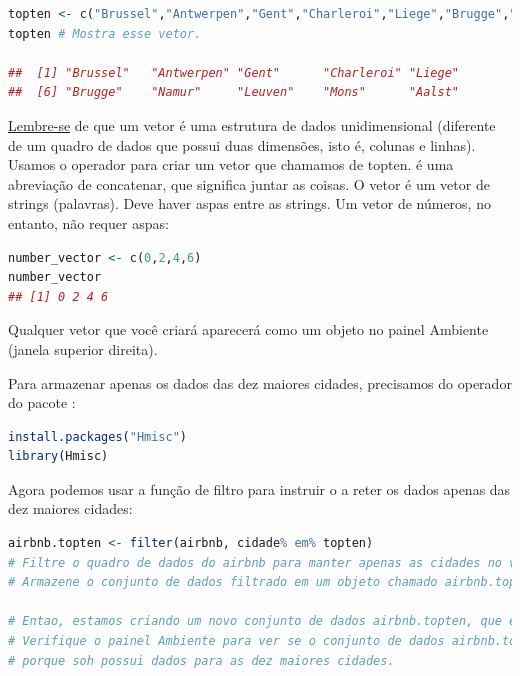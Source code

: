 \documentclass{article}
\begin{document}
\begin{lstlisting}[language=R]
topten <- c("Brussel","Antwerpen","Gent","Charleroi","Liege","Brugge","Namur","Leuven","Mons","Aalst") # Cria um vetor com as 10 maiores cidades
topten # Mostra esse vetor.

##  [1] "Brussel"   "Antwerpen" "Gent"      "Charleroi" "Liege"    
##  [6] "Brugge"    "Namur"     "Leuven"    "Mons"      "Aalst"
\end{lstlisting}

\href{https://bookdown.org/content/1340/airbnbdata.html#assignment}{Lembre-se} de que um vetor é uma estrutura de dados unidimensional (diferente de um quadro de dados que possui duas dimensões, isto é, colunas e linhas). Usamos o operador  para criar um vetor que chamamos de topten.  é uma abreviação de concatenar, que significa juntar as coisas. O vetor  é um vetor de strings (palavras). Deve haver aspas entre as strings. Um vetor de números, no entanto, não requer aspas:

\begin{lstlisting}[language=R]
number_vector <- c(0,2,4,6)
number_vector
## [1] 0 2 4 6
\end{lstlisting}

Qualquer vetor que você criará aparecerá como um objeto no painel Ambiente (janela superior direita).

\vspace{.25cm}
\vspace{.25cm}

Para armazenar apenas os dados das dez maiores cidades, precisamos do operador  do pacote :

\begin{lstlisting}[language=R]
install.packages("Hmisc")
library(Hmisc)
\end{lstlisting}

Agora podemos usar a função de filtro para instruir o \faRProject a reter os dados apenas das dez maiores cidades:

\begin{lstlisting}[language=R]
airbnb.topten <- filter(airbnb, cidade% em% topten)
# Filtre o quadro de dados do airbnb para manter apenas as cidades no vetor topten.
# Armazene o conjunto de dados filtrado em um objeto chamado airbnb.topten.

# Entao, estamos criando um novo conjunto de dados airbnb.topten, que eh um subconjunto do conjunto de dados airbnb.
# Verifique o painel Ambiente para ver se o conjunto de dados airbnb.topten tem menos observacoes que o conjunto de dados airbnb,
# porque soh possui dados para as dez maiores cidades.
\end{lstlisting}
\end{document}
